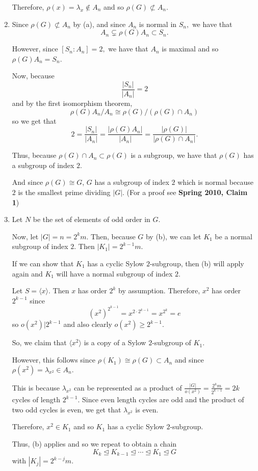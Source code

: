 \documentclass[12pt]{AlgebraQual}
\begin{document}
\begin{solution}
\begin{enumerate}[label=(\alph*)]
    Therefore, $\rho(x)=\lambda_x\notin A_n$ and so $\rho(G)\not\subset A_n.$
    \item Since $\rho(G)\not\subset A_n$ by (a), and since $A_n$ is normal in $S_n,$ we have that $$A_n\subsetneq\rho(G)A_n\subset S_n.$$

    However, since $[S_n:A_n]=2,$ we have that $A_n$ is maximal and so $\rho(G)A_n=S_n$.

    Now, because $$\frac{|S_n|}{|A_n|}=2$$ and by the first isomorphism theorem, $$\rho(G)A_n/A_n\cong\rho(G)/(\rho(G)\cap A_n)$$ so we get that $$2=\frac{|S_n|}{|A_n|}=\frac{|\rho(G)A_n|}{|A_n|}=\frac{|\rho(G)|}{|\rho(G)\cap A_n|}.$$

    Thus, because $\rho(G)\cap A_n\subset \rho(G)$ is a subgroup, we have that $\rho(G)$ has a subgroup of index $2.$

    And since $\rho(G)\cong G$, $G$ has a subgroup of index $2$ which is normal because $2$ is the smallest prime dividing $|G|.$ (For a proof see \textbf{Spring 2010, Claim 1})
    \item Let $N$ be the set of elements of odd order in $G$.

    Now, let $|G|=n=2^km$. Then, because $G$ by (b), we can let $K_1$ be a normal subgroup of index $2$. Then $|K_1|=2^{k-1}m.$

    If we can show that $K_1$ has a cyclic Sylow $2$-subgroup, then (b) will apply again and $K_1$ will have a normal subgroup of index $2.$

    Let $S=\langle x\rangle.$ Then $x$ has order $2^k$ by assumption. Therefore, $x^2$ has order $2^{k-1}$ since $$(x^2)^{2^{k-1}}=x^{2\cdot 2^{k-1}}=x^{2^k}=e$$ so $o(x^2)|2^{k-1}$ and also clearly $o(x^2)\ge 2^{k-1}.$

    So, we claim that $\langle x^2\rangle$ is a copy of a Sylow $2$-subgroup of $K_1.$

    However, this follows since $\rho(K_1)\cong\rho(G)\subset A_n$ and since $\rho(x^2)=\lambda_{x^2}\in A_n.$

    This is because $\lambda_{x^2}$ can be represented as a product of $\frac{|G|}{o(x^2)}=\frac{2^km}{2^{k-1}}=2k$ cycles of length $2^{k-1}.$ Since even length cycles are odd and the product of two odd cycles is even, we get that $\lambda_{x^2}$ is even.

    Therefore, $x^2\in K_1$ and so $K_1$ has a cyclic Sylow $2$-subgroup.

    Thus, (b) applies and so we repeat to obtain a chain $$K_k\trianglelefteq K_{k-1}\trianglelefteq \cdots\trianglelefteq K_1\trianglelefteq G$$ with $|K_j|=2^{k-j}m.$


\end{enumerate}
\end{solution}
\end{document}
